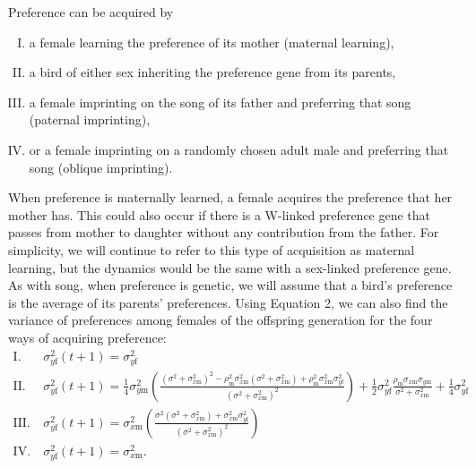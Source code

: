 \documentclass[12pt]{article}
\newcommand{\x}[1]{\text{#1}}
\begin{document}
Preference can be acquired by 
\begin{enumerate}[I.]
\item a female learning the preference of its mother (maternal learning),
\item a bird of either sex inheriting the preference gene from its parents,
\item a female imprinting on the song of its father and preferring that song (paternal imprinting),
\item or a female imprinting on a randomly chosen adult male and preferring that song (oblique imprinting).
\end{enumerate}
When preference is maternally learned, a female acquires the preference that her mother has. This could also occur if there is a W-linked preference gene that passes from mother to daughter without any contribution from the father. For simplicity, we will continue to refer to this type of acquisition as maternal learning, but the dynamics would be the same with a sex-linked preference gene. As with song, when preference is genetic, we will assume that a bird's preference is the average of its parents' preferences. 
Using Equation 2, we can also find the variance of preferences among females of the offspring generation for the four ways of acquiring preference:
\begin{align*}
\x{I.} \ & \sigma_{y\x{f}}^2(t+1) = \sigma_{y\x{f}}^2
\\\x{II.} \ & \sigma_{y\x{f}}^2(t+1) = \frac{1}{4}\sigma_{y\x{m}}^2\left(\frac{(\sigma^2+\sigma_{x\x{m}}^2)^2-\rho_\x{m}^2\sigma_{x\x{m}}^2(\sigma^2+\sigma_{x\x{m}}^2)+\rho_\x{m}^2\sigma_{x\x{m}}^2\sigma_{y\x{f}}^2}{(\sigma^2+\sigma_{x\x{m}}^2)^2}\right)+\frac{1}{2}\sigma_{y\x{f}}^2\frac{\rho_\x{m}\sigma_{x\x{m}}\sigma_{y\x{m}}}{\sigma^2+\sigma_{x\x{m}}^2}+\frac{1}{4}\sigma_{y\x{f}}^2
\\\x{III.} \ & \sigma_{y\x{f}}^2(t+1) = \sigma_{x\x{m}}^2\left(\frac{\sigma^2(\sigma^2+\sigma_{x\x{m}}^2)+\sigma_{ x\x{m}}^2\sigma_{y\x{f}}^2}{(\sigma^2+\sigma_{x\x{m}}^2)^2}\right)
\\\x{IV.} \  & \sigma_{y\x{f}}^2(t+1) = \sigma_{x\x{m}}^2.
\end{align*}
\end{document}
